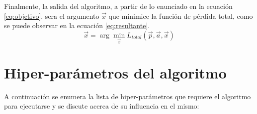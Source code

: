 \documentclass[a4paper,11pt,spanish]{book}
\begin{document}
      Finalmente, la salida del algoritmo, a partir de lo enunciado en la ecuación \eqref{eq:objetivo}, sera el argumento $\overrightarrow{x}$
      que minimice la función de pérdida total, como se puede observar en la ecuación \eqref{eq:resultante}. 
      \begin{equation} \label{eq:resultante}
       \overrightarrow{x} = \arg\min_{\overrightarrow{x}} L_{total}(\overrightarrow{p},\overrightarrow{a},\overrightarrow{x})
      \end{equation}
      
      \section{Hiper-parámetros del algoritmo} \label{sec:hiperparametros}
	A continuación se enumera la lista de hiper-parámetros que requiere el algoritmo para ejecutarse y se discute acerca de su influencia en el mismo:
\end{document}
